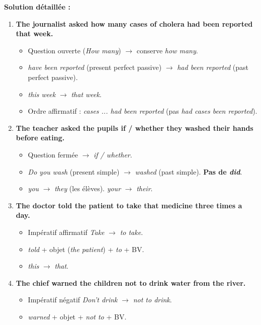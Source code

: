\documentclass[11pt]{article}
\begin{document}
\begin{exoresolu}
\tcblower
\textbf{Solution détaillée :}
\begin{enumerate}
    \item \textbf{The journalist asked how many cases of cholera had been reported that week.}
    \begin{itemize}
        \item Question ouverte (\emph{How many}) $\rightarrow$ conserve \emph{how many}.
        \item \emph{have been reported} (present perfect passive) $\rightarrow$ \emph{had been reported} (past perfect passive).
        \item \emph{this week} $\rightarrow$ \emph{that week}.
        \item Ordre affirmatif : \emph{cases ... had been reported} (pas \emph{had cases been reported}).
    \end{itemize}
    \item \textbf{The teacher asked the pupils if / whether they washed their hands before eating.}
    \begin{itemize}
        \item Question fermée $\rightarrow$ \emph{if / whether}.
        \item \emph{Do you wash} (present simple) $\rightarrow$ \emph{washed} (past simple). \textbf{Pas de \emph{did}}.
        \item \emph{you} $\rightarrow$ \emph{they} (les élèves). \emph{your} $\rightarrow$ \emph{their}.
    \end{itemize}
    \item \textbf{The doctor told the patient to take that medicine three times a day.}
    \begin{itemize}
        \item Impératif affirmatif \emph{Take} $\rightarrow$ \emph{to take}.
        \item \emph{told} + objet (\emph{the patient}) + \emph{to} + BV.
        \item \emph{this} $\rightarrow$ \emph{that}.
    \end{itemize}
    \item \textbf{The chief warned the children not to drink water from the river.}
    \begin{itemize}
        \item Impératif négatif \emph{Don't drink} $\rightarrow$ \emph{not to drink}.
        \item \emph{warned} + objet + \emph{not to} + BV.
    \end{itemize}

\end{enumerate}
\end{exoresolu}
\end{document}
